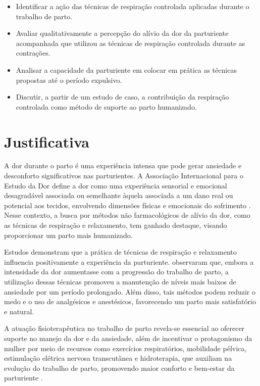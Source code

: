 \documentclass[openright]{tex/estilos/normas-utf-tex}
\begin{document}
\begin{itemize}
    \item Identificar a ação das técnicas de respiração controlada aplicadas durante o trabalho de parto.
    \item Avaliar qualitativamente a percepção do alívio da dor da parturiente acompanhada que utilizou as técnicas de respiração controlada durante as contrações.
    \item Analisar a capacidade da parturiente em colocar em prática as técnicas propostas até o período expulsivo.
    \item Discutir, a partir de um estudo de caso, a contribuição da respiração controlada como método de suporte ao parto humanizado.
\end{itemize}

\chapter{Justificativa}
\label{chap:justificativa}

A dor durante o parto é uma experiência intensa que pode gerar ansiedade e desconforto significativos nas parturientes. A Associação Internacional para o Estudo da Dor define a dor como uma experiência sensorial e emocional desagradável associada ou semelhante àquela associada a um dano real ou potencial aos tecidos, envolvendo dimensões físicas e emocionais do sofrimento \cite{raja2020}. Nesse contexto, a busca por métodos não farmacológicos de alívio da dor, como as técnicas de respiração e relaxamento, tem ganhado destaque, visando proporcionar um parto mais humanizado.

Estudos demonstram que a prática de técnicas de respiração e relaxamento influencia positivamente a experiência da parturiente.  observaram que, embora a intensidade da dor aumentasse com a progressão do trabalho de parto, a utilização dessas técnicas promoveu a manutenção de níveis mais baixos de ansiedade por um período prolongado. Além disso, tais métodos podem reduzir o medo e o uso de analgésicos e anestésicos, favorecendo um parto mais satisfatório e natural.

A atuação fisioterapêutica no trabalho de parto revela-se essencial ao oferecer suporte no manejo da dor e da ansiedade, além de incentivar o protagonismo da mulher por meio de recursos como exercícios respiratórios, mobilidade pélvica, estimulação elétrica nervosa transcutânea e hidroterapia, que auxiliam na evolução do trabalho de parto, promovendo maior conforto e bem-estar da parturiente \cite{sousa2021}.
\end{document}
